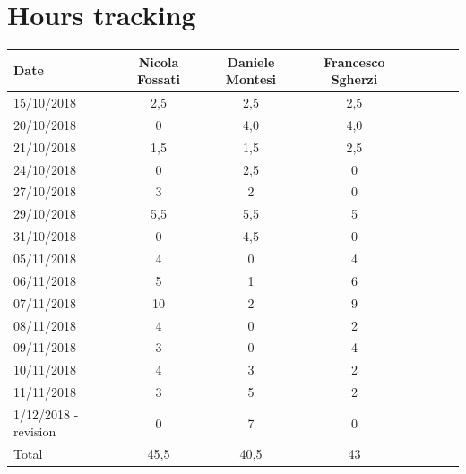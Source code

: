 \documentclass[a4paper,oneside,11pt]{article}
\begin{document}
        \section{Hours tracking}
        \begin{tabular}{l*{6}{c}r}
            Date & Nicola Fossati & Daniele Montesi & Francesco Sgherzi \\
            \hline
            15/10/2018 & 2,5 & 2,5 & 2,5   \\
            \hline
            20/10/2018 & 0 & 4,0 & 4,0 \\
            \hline
            21/10/2018 & 1,5 & 1,5 & 2,5 \\
            \hline
            24/10/2018 & 0 & 2,5 & 0 \\
             \hline
            27/10/2018 & 3 & 2 & 0 \\
             \hline
            29/10/2018 & 5,5 & 5,5 & 5 \\
             \hline
            31/10/2018 & 0 & 4,5 & 0 \\
             \hline
            05/11/2018 & 4 & 0 & 4 \\
            \hline
            06/11/2018 & 5 & 1 & 6 \\
            \hline
            07/11/2018 & 10 & 2 & 9 \\
             \hline
            08/11/2018 & 4 & 0 & 2 \\
            \hline
            09/11/2018 & 3 & 0 & 4 \\
            \hline
            10/11/2018 & 4 & 3 & 2 \\
            \hline
            11/11/2018 & 3 & 5 & 2 \\   
            \hline
            1/12/2018 - revision  & 0 & 7 & 0 \\   
            \hline
            Total & 45,5 & 40,5 & 43 \\  


        \end{tabular}
\end{document}
